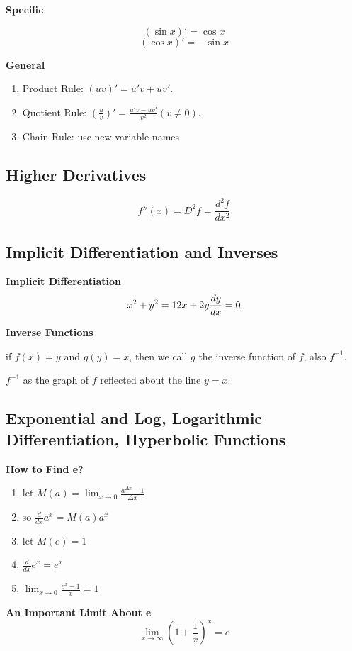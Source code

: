 \documentclass{article}
\newcommand\limitx[1]{\lim_{x \to #1}}
\begin{document}
\textbf{Specific}

$$(\sin x)' = \cos x$$
$$(\cos x)' = -\sin x$$

\textbf{General}

\begin{enumerate}
\item Product Rule: $(uv)' = u'v + uv'$.
\item Quotient Rule: $(\frac{u}{v})' = \frac{u'v-uv'}{v^2}(v \not= 0)$.
\item Chain Rule: use new variable names
\end{enumerate}

\subsection{Higher Derivatives}
$$f''(x) = D^2f = \frac{d^2f}{dx^2}$$

\subsection{Implicit Differentiation and Inverses}

\textbf{Implicit Differentiation}
\begin{equation*}
x^2 + y^2 = 1 \\
2x + 2y\frac{dy}{dx} = 0
\end{equation*}

\textbf{Inverse Functions}

if $f(x) = y$ and $g(y) = x$, then we call $g$ the inverse function of $f$, also $f^{-1}$.

$f^{-1}$ as the graph of $f$ reflected about the line $y = x$.

\subsection{Exponential and Log, Logarithmic Differentiation, Hyperbolic Functions}

\textbf{How to Find e?}
\begin{enumerate}
  \item let $M(a) = \limitx{0}\frac{a^{\Delta x} - 1}{\Delta x}$
  \item so $\frac{d}{dx}a^x = M(a)a^x$
  \item let $M(e) = 1$
  \item $\frac{d}{dx}e^x = e^x$
  \item $\limitx{0}\frac{e^x - 1}{x} = 1$
\end{enumerate}

\textbf{An Important Limit About e}
$$\limitx{\infty}(1 + \frac{1}{x})^x = e$$
\end{document}
